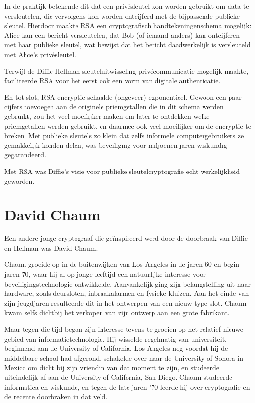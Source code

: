 \documentclass[smalldemyvopaper,11pt,twoside,onecolumn,openright,extrafontsizes,hidelinks]{memoir}
\begin{document}
In de praktijk betekende dit dat een privésleutel kon worden gebruikt om
data te versleutelen, die vervolgens kon worden ontcijferd met de
bijpassende publieke sleutel. Hierdoor maakte RSA een cryptografisch
handtekeningenschema mogelijk: Alice kan een bericht versleutelen, dat
Bob (of iemand anders) kan ontcijferen met haar publieke sleutel, wat
bewijst dat het bericht daadwerkelijk is versleuteld met Alice's
privésleutel.

Terwijl de Diffie-Hellman sleuteluitwisseling privécommunicatie mogelijk
maakte, faciliteerde RSA voor het eerst ook een vorm van digitale
authenticatie.

En tot slot, RSA-encryptie schaalde (ongeveer) exponentieel. Gewoon een
paar cijfers toevoegen aan de originele priemgetallen die in dit schema
werden gebruikt, zou het veel moeilijker maken om later te ontdekken
welke priemgetallen werden gebruikt, en daarmee ook veel moeilijker om
de encryptie te breken. Met publieke sleutels zo klein dat zelfs
informele computergebruikers ze gemakkelijk konden delen, was
beveiliging voor miljoenen jaren wiskundig gegarandeerd.

Met RSA was Diffie's visie voor publieke sleutelcryptografie echt
werkelijkheid geworden.

\section{David Chaum}\label{david-chaum}

Een andere jonge cryptograaf die geïnspireerd werd door de doorbraak van
Diffie en Hellman was David Chaum.

Chaum groeide op in de buitenwijken van Los Angeles in de jaren 60 en
begin jaren 70, waar hij al op jonge leeftijd een natuurlijke interesse
voor beveiligingstechnologie ontwikkelde. Aanvankelijk ging zijn
belangstelling uit naar hardware, zoals deursloten, inbraakalarmen en
fysieke kluizen. Aan het einde van zijn jeugdjaren resulteerde dit in
het ontwerpen van een nieuw type slot. Chaum kwam zelfs dichtbij het
verkopen van zijn ontwerp aan een grote fabrikant.

Maar tegen die tijd begon zijn interesse tevens te groeien op het
relatief nieuwe gebied van informatietechnologie. Hij wisselde
regelmatig van universiteit, beginnend aan de University of California,
Los Angeles nog voordat hij de middelbare school had afgerond, schakelde
over naar de University of Sonora in Mexico om dicht bij zijn vriendin
van dat moment te zijn, en studeerde uiteindelijk af aan de University
of California, San Diego. Chaum studeerde informatica en wiskunde, en
tegen de late jaren '70 leerde hij over cryptografie en de recente
doorbraken in dat veld.
\end{document}
